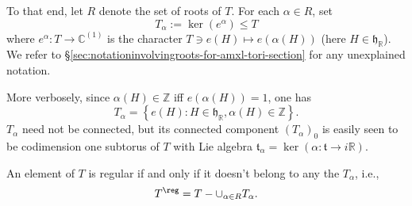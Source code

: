 \documentclass[reqno]{amsart} 
\begin{document}
To that end, let $R$ denote the set of roots of $T$.  For each $\alpha \in R$, set
\begin{equation*}
  T_\alpha := \ker(e^\alpha) \leq T
\end{equation*}
where $e^\alpha : T \rightarrow \mathbb{C}^{(1)}$ is the character $T \ni e(H) \mapsto e(\alpha(H))$ (here $H \in \mathfrak{h}_\mathbb{R}$).  We refer to \S\ref{sec:notationinvolvingroots-for-amxl-tori-section} for any unexplained notation.

More verbosely, since $\alpha(H) \in \mathbb{Z}$ iff $e(\alpha(H)) = 1$, one has
\begin{equation*}
  T_\alpha = \left\{ e(H) : H \in \mathfrak{h}_\mathbb{R}, \alpha(H) \in \mathbb{Z} \right\}.
\end{equation*}
$T_\alpha$ need not be connected, but its connected component $(T_\alpha)_0$ is easily seen to be codimension one subtorus of $T$ with Lie algebra $\mathfrak{t}_\alpha = \ker(\alpha : \mathfrak{t} \rightarrow i \mathbb{R})$.
\begin{proposition}
  An element of $T$ is regular if and only if it doesn't belong to any the $T_\alpha$, i.e.,
  \begin{equation*}
    T^{\reg} = T - \cup_{\alpha \in R} T_\alpha.
  \end{equation*}
\end{proposition}
\end{document}
